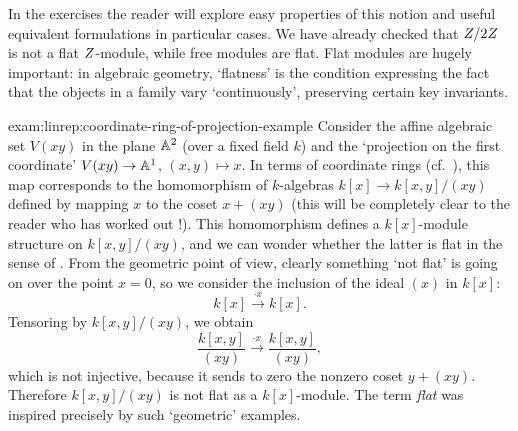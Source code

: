 In the exercises the reader will explore easy properties of this
notion and useful equivalent formulations in particular cases. We have
already checked that $Z/2Z$ is not a flat $Z$-module, while free
modules are flat. Flat modules are hugely important: in algebraic
geometry, `flatness' is the condition expressing the fact that the
objects in a family vary `continuously', preserving certain key
invariants.
\begin{exam}{}{exam:linrep:coordinate-ring-of-projection-example}
  Consider the affine algebraic set $V(xy)$ in the plane $\mathbb{A}^2$ (over
  a fixed field $k$) and the `projection on the first coordinate'
  $V(xy) \to \mathbb{A}^1$, $(x,y) \mapsto x$. In terms of coordinate rings
  (cf.\ ),
  this map corresponds to the homomorphism of $k$-algebras
  $k[x] \to k[x,y]/(xy)$ defined by mapping $x$ to the coset
  $x + (xy)$ (this will be completely clear to the reader who has
  worked out
  !). This
  homomorphism defines a $k[x]$-module structure on $k[x,y]/(xy)$, and
  we can wonder whether the latter is flat in the sense of
  . From the geometric point of view, clearly
  something `not flat' is going on over the point $x = 0$, so we
  consider the inclusion of the ideal $(x)$ in $k[x]$:
  \[
    k[x] \xrightarrow{\cdot x} k[x].
  \]
  Tensoring by $k[x,y]/(xy)$, we obtain
  \[
    \frac{k[x,y]}{(xy)} \xrightarrow{\cdot x} \frac{k[x,y]}{(xy)},
  \]
  which is not injective, because it sends to zero the nonzero coset
  $y + (xy)$. Therefore $k[x,y]/(xy)$ is not flat as a $k[x]$-module.
  The term \emph{flat} was inspired precisely by such `geometric'
  examples.
\end{exam}

